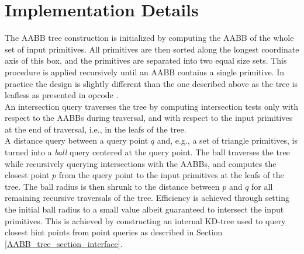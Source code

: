 \section{Implementation Details}
\label{AABB_tree_section_details}

The AABB tree construction is initialized by computing the AABB of the whole set of input primitives. All primitives are then sorted along the longest coordinate axis of this box, and the primitives are separated into two equal size sets. This procedure is applied recursively until an AABB contains a single primitive. In practice the design is slightly different than the one described above as the tree is leafless as presented in {\sc opcode} \cite{cgal:t-ocdl-05}.\\

An intersection query traverses the tree by computing intersection tests only with respect to the AABBs during traversal, and with respect to the input primitives at the end of traversal, i.e., in the leafs of the tree.\\

A distance query between a query point $q$ and, e.g., a set of triangle primitives, is turned into a \emph{ball} query centered at the query point. The ball traverses the tree while recursively querying intersections with the AABBs, and computes the closest point $p$ from the query point to the input primitives at the leafs of the tree. The ball radius is then shrunk to the distance between $p$ and $q$ for all remaining recursive traversals of the tree. Efficiency is achieved through setting the initial ball radius to a small value albeit guaranteed to intersect the input primitives. This is achieved by constructing an internal KD-tree used to query closest hint points from point queries as described in Section \ref{AABB_tree_section_interface}.
